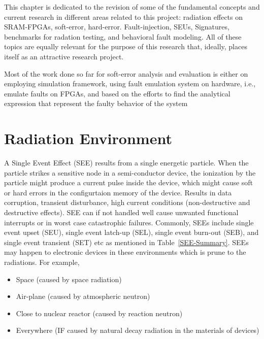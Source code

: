 

This chapter is dedicated to the revision of some of the fundamental concepts and current research in different areas related to this project: radiation effects on SRAM-FPGAs, soft-error, hard-error. Fault-injection, SEUs, Signatures, benchmarks for radation testing, and behavioral fault modeling. All of these topics are equally relevant for the purpose of this research that, ideally, places itself as an attractive research project.


 Most of the work done so far for soft-error analysis and evaluation is either on employing simulation framework, using fault emulation system on hardware, i.e., emulate faults on  FPGAs, and based on the efforts to find the analytical expression that represent the faulty behavior of the system

\section{Radiation Environment}

A Single Event Effect (SEE) results from a single energetic particle. When the particle strikes a sensitive node in a semi-conductor device, the ionization by the particle might produce a current pulse inside the device, which might cause soft or hard errors in the configurtaion memory of the device. Results in data corruption, transient disturbance, high current conditions (non-destructive and destructive
effects). SEE can if not handled well cause unwanted functional interrupts or in worst case catastrophic failures. Commonly, SEEs include single event upset (SEU), single event latch-up (SEL), single event burn-out (SEB), and single event transient (SET) etc as mentioned in Table~\ref{SEE-Summary}. SEEs may happen to electronic devices in these environments which is prune to the radiations. For example,
\begin{itemize}


   \item  Space (caused by space radiation)
    \item Air-plane (caused by atmospheric neutron)
    \item Close to nuclear reactor (caused by reaction neutron)
    \item Everywhere (IF caused by natural decay radiation in the materials of devices)

\end{itemize}



